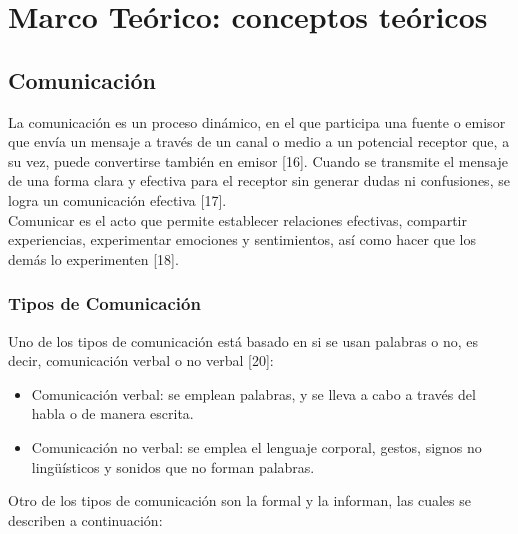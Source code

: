 \chapter{Marco Teórico: conceptos teóricos}
\section{Comunicación}
La comunicación es un proceso dinámico, en el que participa una fuente o emisor que envía un mensaje a través de un canal o medio a un potencial receptor que, a su vez, puede convertirse también en emisor [16]. Cuando se transmite el mensaje de una forma clara y efectiva para el receptor sin generar dudas ni confusiones, se logra un comunicación efectiva [17].\\

Comunicar es el acto que permite establecer relaciones efectivas, compartir experiencias, experimentar emociones y sentimientos, así como hacer que los demás lo experimenten [18].

\subsection{Tipos de Comunicación}
Uno de los tipos de comunicación está basado en si se usan palabras o no, es decir, comunicación verbal o no verbal [20]:
\begin{itemize}
    \item Comunicación verbal: se emplean palabras, y se lleva a cabo a través del habla o de manera escrita.
\item Comunicación no verbal: se emplea el lenguaje corporal, gestos, signos no lingüísticos y sonidos que no forman palabras.
\end{itemize}
Otro de los tipos de comunicación son la formal y la informan, las cuales se describen a continuación:

